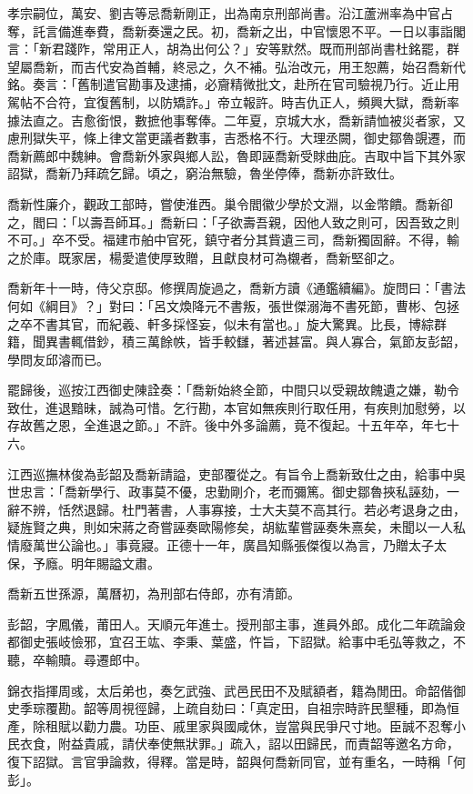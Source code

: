 \begin{pinyinscope}
孝宗嗣位，萬安、劉吉等忌喬新剛正，出為南京刑部尚書。沿江蘆洲率為中官占奪，託言備進奉費，喬新奏還之民。初，喬新之出，中官懷恩不平。一日以事詣閣言：「新君踐阼，常用正人，胡為出何公？」安等默然。既而刑部尚書杜銘罷，群望屬喬新，而吉代安為首輔，終忌之，久不補。弘治改元，用王恕薦，始召喬新代銘。奏言：「舊制遣官勘事及逮捕，必齎精微批文，赴所在官司驗視乃行。近止用駕帖不合符，宜復舊制，以防矯詐。」帝立報許。時吉仇正人，頻興大獄，喬新率據法直之。吉愈銜恨，數摭他事奪俸。二年夏，京城大水，喬新請恤被災者家，又慮刑獄失平，條上律文當更議者數事，吉悉格不行。大理丞闕，御史鄒魯覬遷，而喬新薦郎中魏紳。會喬新外家與鄉人訟，魯即誣喬新受賕曲庇。吉取中旨下其外家詔獄，喬新乃拜疏乞歸。頃之，窮治無驗，魯坐停俸，喬新亦許致仕。

喬新性廉介，觀政工部時，嘗使淮西。巢令閻徽少學於文淵，以金幣饋。喬新卻之，閻曰：「以壽吾師耳。」喬新曰：「子欲壽吾親，因他人致之則可，因吾致之則不可。」卒不受。福建市舶中官死，鎮守者分其貲遺三司，喬新獨固辭。不得，輸之於庫。既家居，楊愛遣使厚致贈，且獻良材可為櫬者，喬新堅卻之。

喬新年十一時，侍父京邸。修撰周旋過之，喬新方讀《通鑑續編》。旋問曰：「書法何如《綱目》？」對曰：「呂文煥降元不書叛，張世傑溺海不書死節，曹彬、包拯之卒不書其官，而紀羲、軒多採怪妄，似未有當也。」旋大驚異。比長，博綜群籍，聞異書輒借鈔，積三萬餘帙，皆手較讎，著述甚富。與人寡合，氣節友彭韶，學問友邱濬而已。

罷歸後，巡按江西御史陳詮奏：「喬新始終全節，中間只以受親故餽遺之嫌，勒令致仕，進退黯昧，誠為可惜。乞行勘，本官如無疾則行取任用，有疾則加慰勞，以存故舊之恩，全進退之節。」不許。後中外多論薦，竟不復起。十五年卒，年七十六。

江西巡撫林俊為彭韶及喬新請謚，吏部覆從之。有旨令上喬新致仕之由，給事中吳世忠言：「喬新學行、政事莫不優，忠勤剛介，老而彌篤。御史鄒魯挾私誣劾，一辭不辨，恬然退歸。杜門著書，人事寡接，士大夫莫不高其行。若必考退身之由，疑旌賢之典，則如宋蔣之奇嘗誣奏歐陽修矣，胡紘輩嘗誣奏朱熹矣，未聞以一人私情廢萬世公論也。」事竟寢。正德十一年，廣昌知縣張傑復以為言，乃贈太子太保，予廕。明年賜謚文肅。

喬新五世孫源，萬曆初，為刑部右侍郎，亦有清節。

彭韶，字鳳儀，莆田人。天順元年進士。授刑部主事，進員外郎。成化二年疏論僉都御史張岐憸邪，宜召王竑、李秉、葉盛，忤旨，下詔獄。給事中毛弘等救之，不聽，卒輸贖。尋遷郎中。

錦衣指揮周彧，太后弟也，奏乞武強、武邑民田不及賦額者，籍為閒田。命韶偕御史季琮覆勘。韶等周視徑歸，上疏自劾曰：「真定田，自祖宗時許民墾種，即為恒產，除租賦以勸力農。功臣、戚里家與國咸休，豈當與民爭尺寸地。臣誠不忍奪小民衣食，附益貴戚，請伏奉使無狀罪。」疏入，詔以田歸民，而責韶等邀名方命，復下詔獄。言官爭論救，得釋。當是時，韶與何喬新同官，並有重名，一時稱「何彭」。


\end{pinyinscope}
